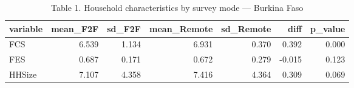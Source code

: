 \begin{table}[t]
\caption*{
{\large Table 1. Household characteristics by survey mode — Burkina Faso}
} 
\fontsize{12.0pt}{14.4pt}\selectfont
\begin{tabular*}{\linewidth}{@{\extracolsep{\fill}}lrrrrrr}
\toprule
variable & mean\_F2F & sd\_F2F & mean\_Remote & sd\_Remote & diff & p\_value \\ 
\midrule\addlinespace[2.5pt]
FCS & 6.539 & 1.134 & 6.931 & 0.370 & 0.392 & 0.000 \\ 
FES & 0.687 & 0.171 & 0.672 & 0.279 & -0.015 & 0.123 \\ 
HHSize & 7.107 & 4.358 & 7.416 & 4.364 & 0.309 & 0.069 \\ 
\bottomrule
\end{tabular*}
\end{table}

